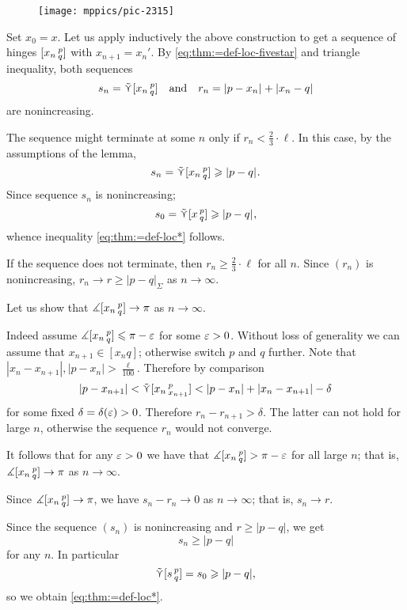 \begin{figure}[h!]
\centering
\texttt{[image: mppics/pic-2315]}
\end{figure}

Set $x_0=x$.
Let us apply inductively the above construction to get a sequence of hinges  $[x_n\,{}^{p}_{q}]$ with $x_{n+1}=x_n'$.
By \ref{eq:thm:=def-loc-fivestar} and triangle inequality, both sequences
\[s_n=\side \hinge{x_n}pq\quad\text{and}\quad r_n=\dist{p}{x_n}{}+\dist{x_n}{q}{}\]
are nonincreasing.

The sequence might terminate at some $n$ only if $r_n< \tfrac{2}{3}\cdot\ell $.
In this case, by the assumptions of the lemma, 
\[s_n=\side \hinge{x_n}p q\ge\dist{p}{q}{}.\]
Since sequence $s_n$ is nonincreasing;
\[s_0=\side \hinge{x}p q\ge\dist{p}{q}{},\]
whence inequality \ref{eq:thm:=def-loc*} follows.

If the sequence does not terminate, then $r_n\ge\tfrac{2}{3}\cdot\ell$ for all $n$.
Since $(r_n)$ is nonincreasing, $r_n\to r\ge |p-q|_\Sigma$ as $n\to\infty$.

Let us show that $\measuredangle[x_n\,{}^{p}_{q}]\to \pi$ as $n\to\infty$.

Indeed assume $\measuredangle[x_n\,{}^{p}_{q}]\leqslant \pi-\varepsilon$ for some $\varepsilon>0$.
Without loss of generality we can assume that $x_{n+1}\in [x_nq]$;
otherwise switch $p$ and $q$ further.
Note that $|x_n-x_{n+1}|,|p-x_n|>\tfrac\ell{100}$.
Therefore by comparison 
\[|p-x_{n+1}|<\side\hinge{x_n}p{x_{n+1}}<|p-x_n|+|x_n-x_{n+1}|-\delta\]
for some fixed $\delta=\delta(\varepsilon)>0$.
Therefore $r_n-r_{n+1}>\delta$.
The latter can not hold for large $n$, otherwise the sequence $r_n$ would not converge.

It follows that for any $\varepsilon>0$ we have that $\measuredangle[x_n\,{}^{p}_{q}]> \pi-\varepsilon$ for all large $n$;
that is, $\measuredangle[x_n\,{}^{p}_{q}]\to \pi$ as $n\to\infty$.

Since $\measuredangle[x_n\,{}^{p}_{q}]\to \pi$, we have 
$s_n-r_n\to 0$ as $n\to\infty$;
that is, $s_n\to r$.

Since the sequence $(s_n)$ is nonincreasing and $r\ge |p-q|$, we get
\[s_n\ge |p-q|\]
for any $n$.
In particular
\[\tilde\curlyvee[s\,{}^{p}_{q}]=s_0\geqslant |p-q|,\] so we obtain \ref{eq:thm:=def-loc*}.
\qeds

